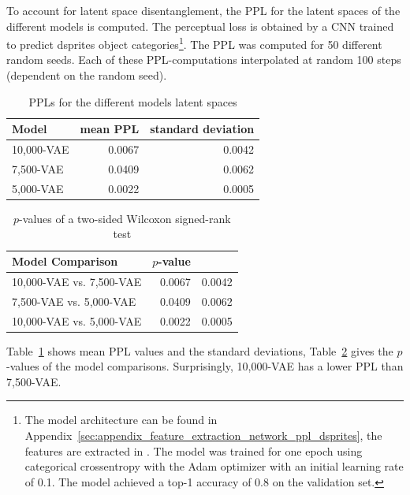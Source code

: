 To account for latent space disentanglement, the \ac{PPL} for the latent spaces of the different models is computed.
The perceptual loss is obtained by a \ac{CNN} trained to predict dsprites object categories\footnote{The model architecture can be found in Appendix~\ref{sec:appendix_feature_extraction_network_ppl_dsprites}, the features are extracted in . The model was trained for one epoch using categorical crossentropy with the Adam optimizer with an initial learning rate of 0.1. The model achieved a top-1 accuracy of 0.8 on the validation set.}.
The \ac{PPL} was computed for 50 different random seeds.
Each of these \ac{PPL}-computations interpolated at random 100 steps (dependent on the random seed).

\begin{table}
    \centering
    \begin{tabular}{lrr}
        \toprule
        Model           & mean \ac{PPL} & standard deviation \\
        \midrule
        10,000-\ac{VAE} & 0.0067        & 0.0042             \\
        7,500-\ac{VAE}  & 0.0409        & 0.0062             \\
        5,000-\ac{VAE}  & 0.0022        & 0.0005             \\
        \bottomrule
    \end{tabular}
    \caption{\acfp{PPL} for the different models latent spaces}
    \label{tab:ppl-dsprites}
\end{table}

\begin{table}
    \centering
    \begin{tabular}{lrr}
        \toprule
        Model Comparison & $p$-value \\
        \midrule
        10,000-\ac{VAE} vs. 7,500-\ac{VAE} & 0.0067 & 0.0042 \\
        7,500-\ac{VAE} vs. 5,000-\ac{VAE}  & 0.0409 & 0.0062 \\
        10,000-\ac{VAE} vs. 5,000-\ac{VAE} & 0.0022 & 0.0005 \\
        \bottomrule
    \end{tabular}
    \caption{$p$-values of a two-sided Wilcoxon signed-rank test}
    \label{tab:ppl-dsprites-p-values}
\end{table}

Table~\ref{tab:ppl-dsprites} shows mean \ac{PPL} values and the standard deviations, Table~\ref{tab:ppl-dsprites-p-values} gives the $p$-values of the model comparisons.
Surprisingly, 10,000-\ac{VAE} has a lower \ac{PPL} than 7,500-\ac{VAE}.

